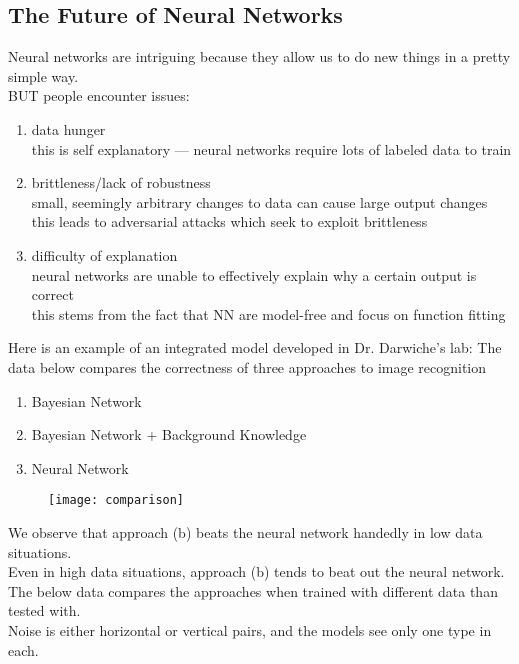 \documentclass[../../lecture_notes.tex]{subfiles}
\begin{document}
\subsection*{The Future of Neural Networks}
\noindent Neural networks are intriguing because they allow us to do new things in a pretty simple way.\\
BUT people encounter issues:
	\begin{enumerate} [itemsep=0mm]
		\item data hunger\\
			this is self explanatory — neural networks require lots of labeled data to train
		\item brittleness/lack of robustness\\
			small, seemingly arbitrary changes to data can cause large output changes\\
			this leads to adversarial attacks which seek to exploit brittleness
		\item difficulty of explanation\\
			neural networks are unable to effectively explain why a certain output is correct\\
			this stems from the fact that NN are model-free and focus on function fitting
	\end{enumerate}\medskip

\noindent Here is an example of an integrated model developed in Dr. Darwiche’s lab:
The data below compares the correctness of three approaches to image recognition
	\begin{enumerate} [itemsep=0mm]
		\item Bayesian Network
		\item Bayesian Network + Background Knowledge
		\item Neural Network
	\end{enumerate}

\begin{center}\begin{figure}[H]
	\texttt{[image: comparison]}
\end{figure}\end{center}

\noindent We observe that approach (b) beats the neural network handedly in low data situations.\\
Even in high data situations, approach (b) tends to beat out the neural network.\\

The below data compares the approaches when trained with different data than tested with.\\
Noise is either horizontal or vertical pairs, and the models see only one type in each.\\
\end{document}
